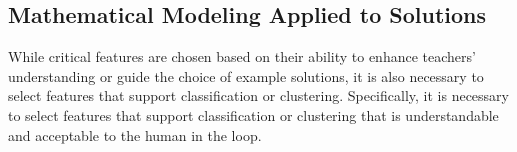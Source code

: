 \documentclass[12pt]{article}
\begin{document}




\subsection{Mathematical Modeling Applied to Solutions}

While critical features are chosen based on their ability to enhance teachers' understanding or guide the choice of example solutions, it is also necessary to select features that support classification or clustering. Specifically, it is necessary to select features that support classification or clustering that is understandable and acceptable to the human in the loop.

%
%
%
\end{document}
